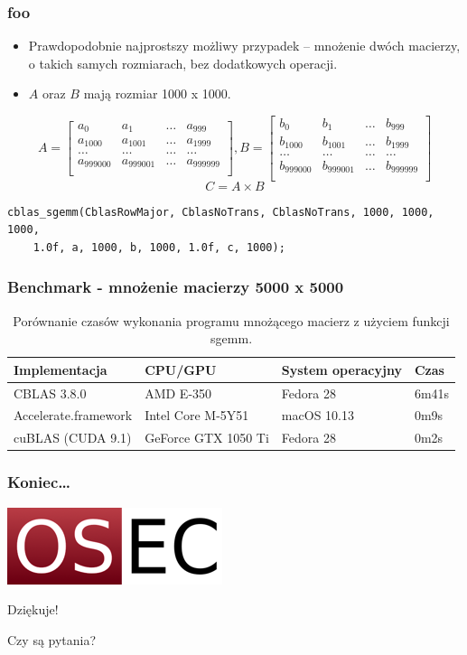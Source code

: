\documentclass[dvipsnames,table]{beamer}
\begin{document}
\begin{frame}[fragile]
	\frametitle{foo}
\begin{itemize}
	\item Prawdopodobnie najprostszy możliwy przypadek -- mnożenie dwóch macierzy, o takich samych rozmiarach, bez dodatkowych operacji. 
	\item $A$ oraz $B$ mają rozmiar 1000 x 1000.
\end{itemize}
\scriptsize
\[
A =
\begin{bmatrix}
	a_{0} & a_{1} & \dots & a_{999} \\
	a_{1000} & a_{1001} & \dots & a_{1999} \\
	\dots & \dots & \dots & \dots \\
	a_{999000} & a_{999001} & \dots & a_{999999} \\
\end{bmatrix}
, B = 
\begin{bmatrix}
	b_{0} & b_{1} & \dots & b_{999} \\
	b_{1000} & b_{1001} & \dots & b_{1999} \\
	\dots & \dots & \dots & \dots \\
	b_{999000} & b_{999001} & \dots & b_{999999} \\
\end{bmatrix}
\]
\[
C = A \times B
\]
\normalsize
\begin{lstlisting}
cblas_sgemm(CblasRowMajor, CblasNoTrans, CblasNoTrans, 1000, 1000, 1000,
	1.0f, a, 1000, b, 1000, 1.0f, c, 1000);
\end{lstlisting}
\end{frame}

\begin{frame}
\frametitle{Benchmark - mnożenie macierzy 5000 x 5000}
\begin{table}[]
\centering
\caption{Porównanie czasów wykonania programu mnożącego macierz z użyciem funkcji sgemm.}
\label{porownanie}
\scriptsize
\begin{tabular}{llll}
\hline
Implementacja & CPU/GPU   & System operacyjny & Czas  \\ \hline
CBLAS 3.8.0   & AMD E-350 & Fedora 28         & 6m41s \\
Accelerate.framework & Intel Core M-5Y51  & macOS 10.13 & 0m9s  \\
cuBLAS (CUDA 9.1) & GeForce GTX 1050 Ti & Fedora 28 & 0m2s  \\ \hline
\end{tabular}
\normalsize
\end{table}
\end{frame}

\begin{frame}
\frametitle{Koniec\ldots}
\begin{center}
\includegraphics[scale=0.5]{img-oseclogo.png}

Dziękuje!

Czy są pytania?

\end{center}
\end{frame}
\end{document}

